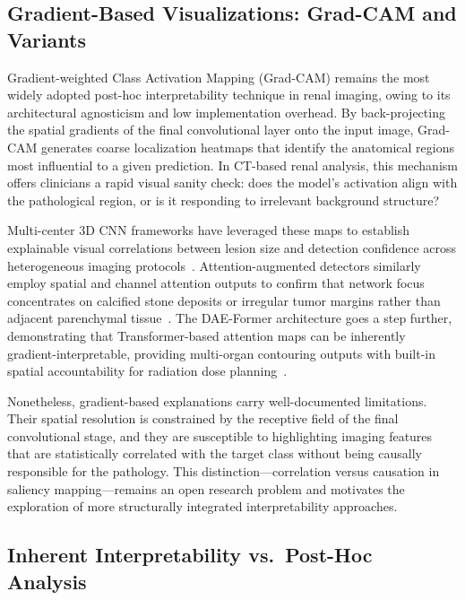 \documentclass[pdflatex,sn-mathphys-num]{sn-jnl}%
\begin{document}
\subsection{Gradient-Based Visualizations: Grad-CAM and Variants}
\label{subsec:gradcam}

Gradient-weighted Class Activation Mapping (Grad-CAM) remains the most widely adopted post-hoc interpretability technique in renal imaging, owing to its architectural agnosticism and low implementation overhead. By back-projecting the spatial gradients of the final convolutional layer onto the input image, Grad-CAM generates coarse localization heatmaps that identify the anatomical regions most influential to a given prediction. In CT-based renal analysis, this mechanism offers clinicians a rapid visual sanity check: does the model's activation align with the pathological region, or is it responding to irrelevant background structure?

Multi-center 3D CNN frameworks have leveraged these maps to establish explainable visual correlations between lesion size and detection confidence across heterogeneous imaging protocols~\cite{liang2025multicenter}. Attention-augmented detectors similarly employ spatial and channel attention outputs to confirm that network focus concentrates on calcified stone deposits or irregular tumor margins rather than adjacent parenchymal tissue~\cite{sajid2026yolov8}. The DAE-Former architecture goes a step further, demonstrating that Transformer-based attention maps can be inherently gradient-interpretable, providing multi-organ contouring outputs with built-in spatial accountability for radiation dose planning~\cite{azad2023daeformer}.

Nonetheless, gradient-based explanations carry well-documented limitations. Their spatial resolution is constrained by the receptive field of the final convolutional stage, and they are susceptible to highlighting imaging features that are statistically correlated with the target class without being causally responsible for the pathology. This distinction---correlation versus causation in saliency mapping---remains an open research problem and motivates the exploration of more structurally integrated interpretability approaches.


\subsection{Inherent Interpretability vs.\ Post-Hoc Analysis}
\label{subsec:inherent_vs_posthoc}
\end{document}
